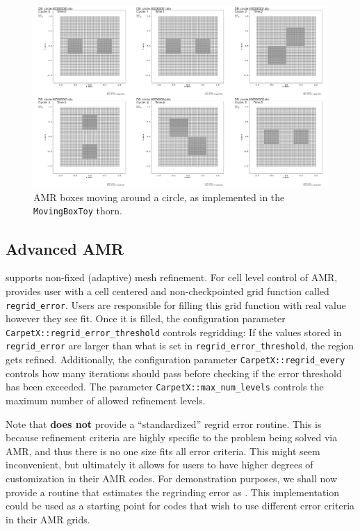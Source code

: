 \begin{figure}[ht]
  \begin{center}
      \includegraphics[width=\linewidth]{boxes_frames.png}
  \end{center}
  \caption{AMR boxes moving around a circle, as implemented in the \texttt{MovingBoxToy} thorn.}
  \label{fig:boxes_circle}
\end{figure}

\subsection{Advanced AMR}
\label{sec:advanced_amr}

\CarpetX\space supports non-fixed (adaptive) mesh refinement. For cell level control of AMR, \CarpetX\space provides user with a cell centered and non-checkpointed grid function called \texttt{regrid\_error}. Users are responsible for filling this grid function with real value however they see fit. Once it is filled, the configuration parameter \texttt{CarpetX::regrid\_error\_threshold} controls regridding: If the values stored in \texttt{regrid\_error} are larger than what is set in \texttt{regrid\_error\_threshold}, the region gets refined. Additionally, the configuration parameter \texttt{CarpetX::regrid\_every} controls how many iterations should pass before checking if the error threshold has been exceeded. The parameter \texttt{CarpetX::max\_num\_levels} controls the maximum number of allowed refinement levels.

Note that \CarpetX\space \textbf{does not} provide a ``standardized'' regrid error routine. This is because refinement criteria are highly specific to the problem being solved via AMR, and thus there is no one size fits all error criteria. This might seem inconvenient, but ultimately it allows for users to have higher degrees of customization in their AMR codes. For demonstration purposes, we shall now provide a routine that estimates the regrinding error as . This implementation could be used as a starting point for codes that wish to use different error criteria in their AMR grids.

